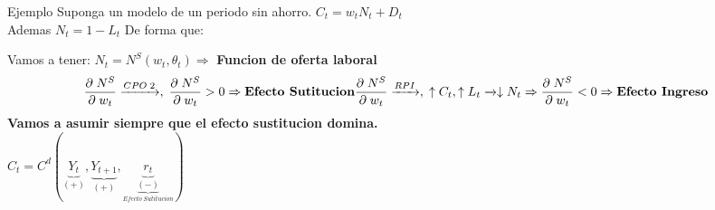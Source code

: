 \documentclass[12pt]{article}
\begin{document}
\begin{ejemplo}Ejemplo 
    Suponga un modelo de un periodo sin ahorro. 
    $C_t=w_tN_t+D_t$\\
    Ademas $N_t=1-L_t$
    De forma que: 
    \begin{figure} [H]
            \centering 
            
            \label{fig:placeholder}
    \end{figure}
    Vamos a tener: $N_t=N^S(w_t,\theta_t) \Rightarrow{}$ \textbf{Funcion de oferta laboral}\\
    $$\frac{\partial\;N^S}{\partial\; w_t}\xrightarrow{CPO\;2},\;\frac{\partial\;N^S}{\partial\; w_t}>0 \Rightarrow{}\textbf{Efecto Sutitucion}\\\\
    \frac{\partial\;N^S}{\partial\; w_t}\xrightarrow{RPI},\;\uparrow C_t,\uparrow L_t\xrightarrow{}\downarrow N_t\Rightarrow{} \frac{\partial\;N^S}{\partial\; w_t}<0 \Rightarrow{}\textbf{Efecto Ingreso}
    $$
    \textbf{Vamos a asumir siempre que el efecto sustitucion domina.}\\
    $C_t=C^d(\underbrace{Y_t}_{(+)},\underbrace{Y_{t+1}}_{(+)},\underbrace{r_t}_{\underbrace{(-)}_{Efecto\; Sutitucion}})$
\end{ejemplo}
\end{document}
